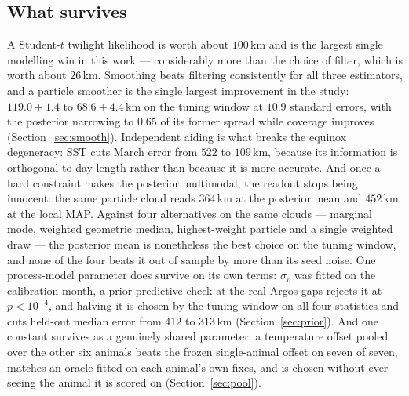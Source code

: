 \documentclass[conference]{IEEEtran}
\begin{document}
\subsection{What survives}
A Student-$t$ twilight likelihood is worth about $100$\,\si{\km} and is the
largest single modelling win in this work --- considerably more than the choice
of filter, which is worth about $26$\,\si{\km}. Smoothing beats filtering
consistently for all three estimators, and a particle smoother is the single
largest improvement in the study: $119.0\pm1.4$ to $68.6\pm4.4$\,\si{\km} on the
tuning window at $10.9$ standard errors, with the posterior narrowing to $0.65$
of its former spread while coverage improves (Section~\ref{sec:smooth}). Independent aiding is what breaks the
equinox degeneracy: SST cuts March error from $522$ to $109$\,\si{\km}, because
its information is orthogonal to day length rather than because it is more
accurate. And once a hard constraint makes the posterior multimodal, the readout
stops being innocent: the same particle cloud reads $364$\,\si{\km} at the
posterior mean and $452$\,\si{\km} at the local MAP. Against four alternatives on
the same clouds --- marginal mode, weighted geometric median, highest-weight
particle and a single weighted draw --- the posterior mean is nonetheless the best
choice on the tuning window, and none of the four beats it out of sample by more
than its seed noise. One process-model parameter does survive on its own
terms: $\sigma_v$ was fitted on the calibration month, a prior-predictive check
at the real Argos gaps rejects it at $p<10^{-4}$, and halving it is chosen by
the tuning window on all four statistics and cuts held-out median error from
$412$ to $313$\,\si{\km} (Section~\ref{sec:prior}). And one constant survives
as a genuinely shared parameter: a temperature offset pooled over the other six
animals beats the frozen single-animal offset on seven of seven, matches an
oracle fitted on each animal's own fixes, and is chosen without ever seeing the
animal it is scored on (Section~\ref{sec:pool}).
\end{document}
